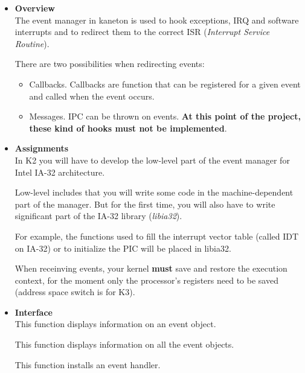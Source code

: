 \begin{itemize}
  \item {\bf Overview}\\

    The event manager in kaneton is used to hook exceptions, IRQ and
    software interrupts and to redirect them to the correct ISR
    (\emph{Interrupt Service Routine}).

    There are two possibilities when redirecting events:
    \begin{itemize}
      \item
	Callbacks. Callbacks are function that can be registered for a
	given event and called when the event occurs.
      \item
	Messages. IPC can be thrown on events. \textbf{At this point
	of the project, these kind of hooks must not be implemented}.
    \end{itemize}

  \item {\bf Assignments}\\

    In K2 you will have to develop the low-level part of the event
    manager for Intel IA-32 architecture.

    Low-level includes that you will write some code in the
    machine-dependent part of the manager. But for the first time, you
    will also have to write significant part of the IA-32 library
    (\emph{libia32}).

    For example, the functions used to fill the interrupt vector table
    (called IDT on IA-32) or to initialize the PIC will be placed in
    libia32.

    When receinving events, your kernel \textbf{must} save and restore
    the execution context, for the moment only the processor's
    registers need to be saved (address space switch is for K3).

  \item {\bf Interface}\\
	 {
	   This function displays information on an event object.
	 }

	 {
	   This function displays information on all the event objects.
	 }

	 {
	   This function installs an event handler.

}
\end{itemize}
